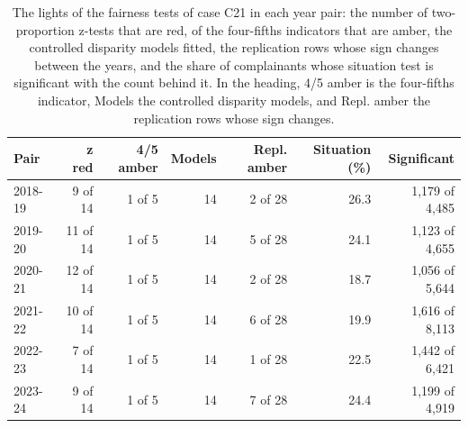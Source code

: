 \begin{table}[htbp]
\centering
\setlength{\tabcolsep}{3pt}
\footnotesize
\caption{The lights of the fairness tests of case C21 in each year pair: the number of two-proportion z-tests that are red, of the four-fifths indicators that are amber, the controlled disparity models fitted, the replication rows whose sign changes between the years, and the share of complainants whose situation test is significant with the count behind it. In the heading, 4/5 amber is the four-fifths indicator, Models the controlled disparity models, and Repl. amber the replication rows whose sign changes.}
\label{tab:vt-c21-lights}
\begin{tabular}{lrrrrrr}
\toprule
Pair & z red & 4/5 amber & Models & Repl. amber & Situation (\%) & Significant \\
\midrule
2018-19 & 9 of 14 & 1 of 5 & 14 & 2 of 28 & 26.3 & 1,179 of 4,485 \\
2019-20 & 11 of 14 & 1 of 5 & 14 & 5 of 28 & 24.1 & 1,123 of 4,655 \\
2020-21 & 12 of 14 & 1 of 5 & 14 & 2 of 28 & 18.7 & 1,056 of 5,644 \\
2021-22 & 10 of 14 & 1 of 5 & 14 & 6 of 28 & 19.9 & 1,616 of 8,113 \\
2022-23 & 7 of 14 & 1 of 5 & 14 & 1 of 28 & 22.5 & 1,442 of 6,421 \\
2023-24 & 9 of 14 & 1 of 5 & 14 & 7 of 28 & 24.4 & 1,199 of 4,919 \\
\bottomrule
\end{tabular}
\end{table}
